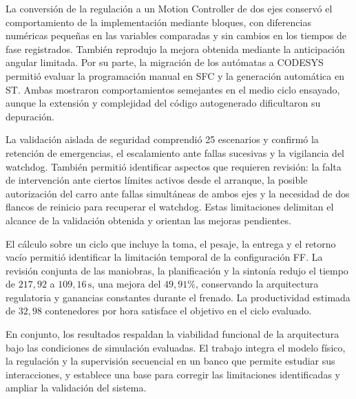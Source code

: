 \documentclass[a4paper,10pt,onecolumn,journal]{ieeeconf}
\numberwithin{equation}{section}
\newcommand{\un}[1]{\,\mathrm{#1}}
\begin{document}
La conversión de la regulación a un Motion Controller de dos ejes conservó el comportamiento de la implementación mediante bloques, con diferencias numéricas pequeñas en las variables comparadas y sin cambios en los tiempos de fase registrados. También reprodujo la mejora obtenida mediante la anticipación angular limitada. Por su parte, la migración de los autómatas a CODESYS permitió evaluar la programación manual en SFC y la generación automática en ST. Ambas mostraron comportamientos semejantes en el medio ciclo ensayado, aunque la extensión y complejidad del código autogenerado dificultaron su depuración.

La validación aislada de seguridad comprendió 25 escenarios y confirmó la retención de emergencias, el escalamiento ante fallas sucesivas y la vigilancia del watchdog. También permitió identificar aspectos que requieren revisión: la falta de intervención ante ciertos límites activos desde el arranque, la posible autorización del carro ante fallas simultáneas de ambos ejes y la necesidad de dos flancos de reinicio para recuperar el watchdog. Estas limitaciones delimitan el alcance de la validación obtenida y orientan las mejoras pendientes.

El cálculo sobre un ciclo que incluye la toma, el pesaje, la entrega
y el retorno vacío permitió identificar la limitación temporal de la configuración FF. La revisión conjunta de las maniobras, la planificación y la sintonía redujo el tiempo de $217{,}92$ a $109{,}16\un{s}$, una mejora del $49{,}91\%$, conservando la arquitectura regulatoria y ganancias constantes durante el frenado.
La productividad estimada de $32{,}98$ contenedores por hora satisface el objetivo en el ciclo evaluado.

En conjunto, los resultados respaldan la viabilidad funcional de la arquitectura bajo las condiciones de simulación evaluadas. El trabajo integra el modelo físico, la regulación y la supervisión secuencial en un banco que permite estudiar sus interacciones, y establece una base para corregir las limitaciones identificadas y ampliar la validación del sistema.

\par
{}
\end{document}
